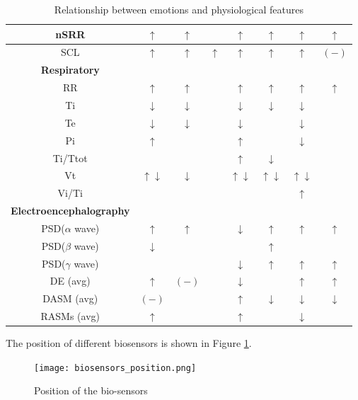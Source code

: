 \begin{table}[h!]
\begin{adjustwidth}{-3cm}{-1cm}
\begin{tabular}{|c|c|c|c|c|c|c|c|}
		\hline nSRR & $\uparrow$ & $\uparrow$ & & $\uparrow$ & $\uparrow$ & $\uparrow$ & $\uparrow$ \\
		\hline SCL & $\uparrow$ & $\uparrow$ & $\uparrow$ & $\uparrow$ & $\uparrow$ & $\uparrow$ & $(-)$ \\
		\hline \hline \textbf{Respiratory} &&&&&&& \\ 
		\hline RR & $\uparrow$ & $\uparrow$ & & $\uparrow$ & $\uparrow$ & $\uparrow$ & $\uparrow$ \\
		\hline Ti & $\downarrow$ & $\downarrow$ & & $\downarrow$ & $\downarrow$ & $\downarrow$ & \\
		\hline Te & $\downarrow$ & $\downarrow$ & & $\downarrow$ & & $\downarrow$ & \\
		\hline Pi & $\uparrow$ & & & $\uparrow$ & & $\downarrow$ & \\
		\hline Ti/Ttot & & & & $\uparrow$ & $\downarrow$ & & \\
		\hline Vt & $\uparrow\downarrow$ & $\downarrow$ & & $\uparrow\downarrow$ & $\uparrow\downarrow$ & $\uparrow\downarrow$ & \\
		\hline Vi/Ti & & & & & & $\uparrow$ & \\
		\hline \hline \textbf{Electroencephalography} &&&&&&& \\ 
		\hline PSD($\alpha$ wave) & $\uparrow$ & $\uparrow$ & & $\downarrow$ & $\uparrow$ & $\uparrow$ &  $\uparrow$ \\
		\hline PSD($\beta$ wave) & $\downarrow$ & & & & $\uparrow$ & & \\
		\hline PSD($\gamma$ wave) & & & & $\downarrow$ & $\uparrow$ & $\uparrow$ & $\uparrow$ \\
		\hline DE (avg) & $\uparrow$ & $(-)$ & & $\downarrow$ & & $\uparrow$ & $\uparrow$ \\
		\hline DASM (avg) & $(-)$ & & & $\uparrow$ & $\downarrow$ & $\downarrow$ & $\downarrow$ \\
		\hline RASMs (avg) & $\uparrow$ & & & $\uparrow$ & & $\downarrow$ & \\
		\hline
	\end{tabular}
	\end{adjustwidth}
	\caption{Relationship between emotions and physiological features}
	\label{table:physiological_features_relation}
\end{table}
\newpage
The position of different biosensors is shown in Figure \ref{fig:biosensors_position}.
\begin{figure}[h]
    \centering
    \texttt{[image: biosensors\_position.png]} 
	\caption{Position of the bio-sensors}
    \label{fig:biosensors_position}
\end{figure}


